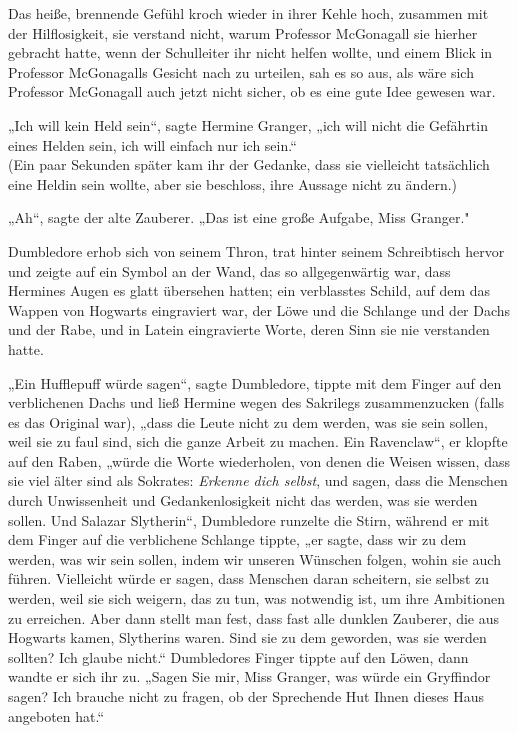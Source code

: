 {Das heiße, brennende Gefühl kroch wieder in ihrer Kehle hoch, zusammen mit der Hilflosigkeit, sie verstand nicht, warum Professor McGonagall sie hierher gebracht hatte, wenn der Schulleiter ihr nicht helfen wollte, und einem Blick in Professor McGonagalls Gesicht nach zu urteilen, sah es so aus, als wäre sich Professor McGonagall auch jetzt nicht sicher, ob es eine gute Idee gewesen war.

„Ich will kein Held sein“, sagte Hermine Granger, „ich will nicht die Gefährtin eines Helden sein, ich will einfach nur ich sein.“\\ (Ein paar Sekunden später kam ihr der Gedanke, dass sie vielleicht tatsächlich eine Heldin sein wollte, aber sie beschloss, ihre Aussage nicht zu ändern.)

„Ah“, sagte der alte Zauberer. „Das ist eine große Aufgabe, Miss Granger."

Dumbledore erhob sich von seinem Thron, trat hinter seinem Schreibtisch hervor und zeigte auf ein Symbol an der Wand, das so allgegenwärtig war, dass Hermines Augen es glatt übersehen hatten; ein verblasstes Schild, auf dem das Wappen von Hogwarts eingraviert war, der Löwe und die Schlange und der Dachs und der Rabe, und in Latein eingravierte Worte, deren Sinn sie nie verstanden hatte.

„Ein Hufflepuff würde sagen“, sagte Dumbledore, tippte mit dem Finger auf den verblichenen Dachs und ließ Hermine wegen des Sakrilegs zusammenzucken (falls es das Original war), „dass die Leute nicht zu dem werden, was sie sein sollen, weil sie zu faul sind, sich die ganze Arbeit zu machen. Ein Ravenclaw“, er klopfte auf den Raben, „würde die Worte wiederholen, von denen die Weisen wissen, dass sie viel älter sind als Sokrates: \emph{Erkenne dich selbst}, und sagen, dass die Menschen durch Unwissenheit und Gedankenlosigkeit nicht das werden, was sie werden sollen. Und Salazar Slytherin“, Dumbledore runzelte die Stirn, während er mit dem Finger auf die verblichene Schlange tippte, „er sagte, dass wir zu dem werden, was wir sein sollen, indem wir unseren Wünschen folgen, wohin sie auch führen. Vielleicht würde er sagen, dass Menschen daran scheitern, sie selbst zu werden, weil sie sich weigern, das zu tun, was notwendig ist, um ihre Ambitionen zu erreichen. Aber dann stellt man fest, dass fast alle dunklen Zauberer, die aus Hogwarts kamen, Slytherins waren. Sind sie zu dem geworden, was sie werden sollten? Ich glaube nicht.“ Dumbledores Finger tippte auf den Löwen, dann wandte er sich ihr zu. „Sagen Sie mir, Miss Granger, was würde ein Gryffindor sagen? Ich brauche nicht zu fragen, ob der Sprechende Hut Ihnen dieses Haus angeboten hat.“

}
